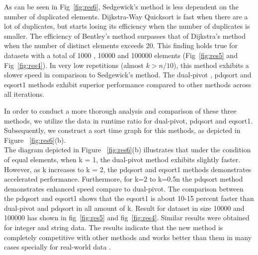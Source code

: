 \documentclass{article}
\begin{document}
\begin{figure*}[h]
\begin{subfigure}[b]{0.6\linewidth}
   \caption{}
   \end{subfigure}
   \vspace*{-7mm}
   \caption{(a): Runtime (in second) for  dataset of size $10^{6}$ for increasing number of distinct elements.
   (b): Runtime ratio for dual-pivot , pdqsort and eqsort methods}
   \label{fig:res6}
   \end{figure*}
As can be seen in  Fig~\ref{fig:res6}, Sedgewick's method is less dependent on the number of duplicated elements.
Dijkstra-Way Quicksort is fast when there are a lot of duplicates, but starts losing its efficiency when the number of duplicates is smaller. The efficiency of Bentley's method surpasses that of Dijkstra's method when the number of distinct elements exceeds 20. This finding holds true for  datasets with a total of 1000 , 10000 and 100000 elements (Fig~\ref{fig:res5} and Fig~\ref{fig:res4}). In very low repetitions (almost $ k> n/10$), this method exhibits a slower speed in comparison to Sedgewick's method. The dual-pivot , pdqsort and eqsort1 methods exhibit superior performance compared to other methods across all iterations.


 In order to conduct a more thorough analysis and comparison of these three methods, we utilize the data in runtime ratio for dual-pivot, pdqsort and eqsort1. Subsequently, we construct a sort time graph for this methods, as depicted in Figure ~\ref{fig:res6}(b).\\

The diagram depicted in Figure ~\ref{fig:res6}(b) illustrates that under the condition of equal elements, when k = 1, the dual-pivot method exhibits slightly faster. However, as k increases to k = 2, the pdqsort and eqsort1  methods demonstrates accelerated performance. Furthermore, for k=2 to k=0.5n the pdqsort  method demonstrates enhanced speed compare to dual-pivot. The comparison between the pdqsort and eqsort1 shows that the eqsort1 is about 10-15 percent faster than dual-pivot and pdqsort in all amount of k. Result for dataset in size 10000 and 100000 has shown in fig~\ref{fig:res5} and fig~\ref{fig:res4}. Similar results were obtained for integer and string data. The results indicate that the new method  is completely competitive with other methods and works better than them in many cases specially for real-world data .
\end{document}
